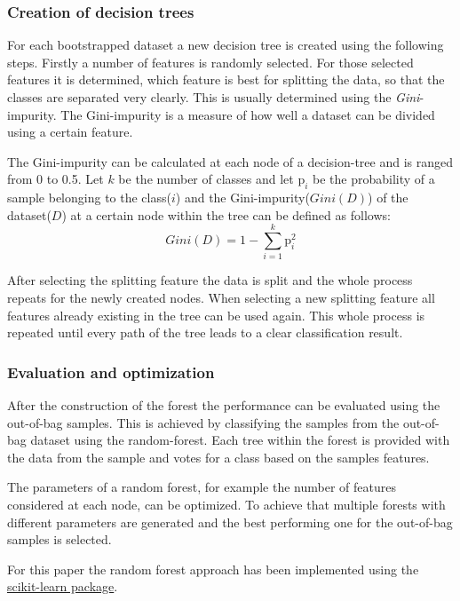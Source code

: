 \subsubsection*{Creation of decision trees}
For each bootstrapped dataset a new decision tree is created using the following steps. Firstly a number of features is randomly selected.
For those selected features it is determined, which feature is best for splitting the data, so that the classes are separated very clearly.
This is usually determined using the \textit{Gini}-impurity.
The Gini-impurity is a measure of how well a dataset can be divided using a certain feature.

The Gini-impurity can be calculated at each node of a decision-tree and is ranged from 0 to 0.5.
Let $k$ be the number of classes and let $\mathrm{p}_{i}$ be the probability of a sample belonging to the class($i$) and the Gini-impurity($Gini(D)$) of the dataset($D$)
at a certain node within the tree can be defined as follows:
\begin{equation*}
    Gini(D) = 1 - \sum_{i=1}^{k} \mathrm{p}_{i}^2
\end{equation*} \cite[]{Karabiber}

After selecting the splitting feature the data is split and the whole process repeats for the newly created nodes.
When selecting a new splitting feature all features already existing in the tree can be used again. This whole process is 
repeated until every path of the tree leads to a clear classification result\cite[]{Breiman2001}.

\subsubsection*{Evaluation and optimization}
After the construction of the forest the performance can be evaluated using the out-of-bag samples.
This is achieved by classifying the samples from the out-of-bag dataset using the random-forest. Each tree within the forest is provided with the data from the sample
and votes for a class based on the samples features.

The parameters of a random forest, for example the number of features considered at each node, can be optimized. To achieve that multiple forests with 
different parameters are generated and the best performing one for the out-of-bag samples is selected\cite[]{Breiman2001}.

For this paper the random forest approach has been implemented using the \href{https://scikit-learn.org/stable/index.html}{scikit-learn package}. 



